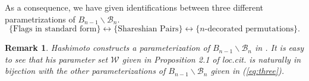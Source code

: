 \documentclass[12pt]{amsart}
\numberwithin{equation}{section}
\newtheorem{rem}[thm]{Remark}
\newcommand{\fb}{\mbox{${\mathfrak b}$}}
\newcommand{\C}{\mbox{${\mathbb C}$}}
\newcommand{\Ad}{{\rm Ad}}
\newcommand{\B}{\mathcal{B}}
\newcommand{\F}{\mathcal{F}}
\newcommand{\Borbitspace}{B_{n-1}\backslash\B_{n}}
\begin{document}



As a consequence, we have given identifications between three different parametrizations of $\Borbitspace$.
\begin{equation}\label{eq:three}
\{ \mbox{Flags in standard form}\} \longleftrightarrow \{\mbox{Shareshian Pairs}\}\longleftrightarrow\{ \mbox{$n$-decorated permutations}\}.  
\end{equation}

\begin{rem}
Hashimoto constructs a parameterization of $\Borbitspace$ in \cite{Hashi}.  It is easy to see that his parameter set $\mathcal{W}$ given in Proposition 2.1 of \emph{loc.cit.} is naturally in bijection with the other parameterizations of $\Borbitspace$ given in (\ref{eq:three}).
\end{rem}
\end{document}
